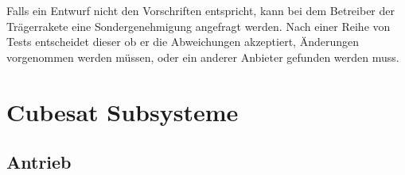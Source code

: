		Falls ein Entwurf nicht den Vorschriften entspricht, kann bei dem Betreiber der Trägerrakete eine Sondergenehmigung angefragt werden. Nach einer Reihe von Tests entscheidet dieser ob er die Abweichungen akzeptiert, Änderungen vorgenommen werden müssen, oder ein anderer Anbieter gefunden werden muss. \cite{CaliforniaPolytechnicStateUniversity.2014} 

	\section{Cubesat Subsysteme}%
		\subsection{Antrieb}%


